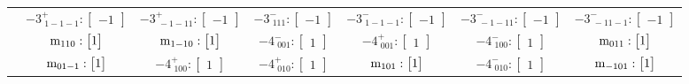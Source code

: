 \documentclass[fleqn,8pt,landscape]{jsarticle}
\begin{document}
\begin{longtable}{ccccccc}
& $ -3^{+}_{\,\,1-1-1}:\begin{bmatrix} -1 \end{bmatrix} $ & $ -3^{+}_{\,\,-1-11}:\begin{bmatrix} -1 \end{bmatrix} $ & $ -3^{-}_{\,\,111}:\begin{bmatrix} -1 \end{bmatrix} $ & $ -3^{-}_{\,\,1-1-1}:\begin{bmatrix} -1 \end{bmatrix} $ & $ -3^{-}_{\,\,-1-11}:\begin{bmatrix} -1 \end{bmatrix} $ & $ -3^{-}_{\,\,-11-1}:\begin{bmatrix} -1 \end{bmatrix} $ \\
& $ {\rm m}_{110}:\begin{bmatrix} 1 \end{bmatrix} $ & $ {\rm m}_{1-10}:\begin{bmatrix} 1 \end{bmatrix} $ & $ -4^{-}_{\,\,001}:\begin{bmatrix} 1 \end{bmatrix} $ & $ -4^{+}_{\,\,001}:\begin{bmatrix} 1 \end{bmatrix} $ & $ -4^{-}_{\,\,100}:\begin{bmatrix} 1 \end{bmatrix} $ & $ {\rm m}_{011}:\begin{bmatrix} 1 \end{bmatrix} $ \\
& $ {\rm m}_{01-1}:\begin{bmatrix} 1 \end{bmatrix} $ & $ -4^{+}_{\,\,100}:\begin{bmatrix} 1 \end{bmatrix} $ & $ -4^{+}_{\,\,010}:\begin{bmatrix} 1 \end{bmatrix} $ & $ {\rm m}_{101}:\begin{bmatrix} 1 \end{bmatrix} $ & $ -4^{-}_{\,\,010}:\begin{bmatrix} 1 \end{bmatrix} $ & $ {\rm m}_{-101}:\begin{bmatrix} 1 \end{bmatrix} $ \\ \hline

\end{longtable}
\end{document}
